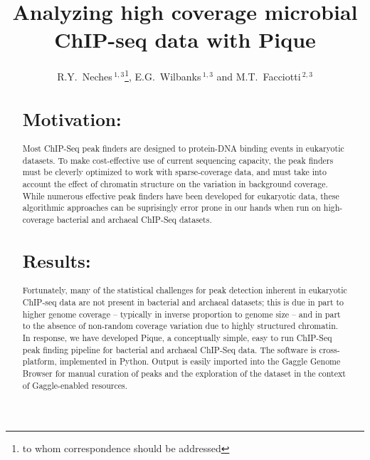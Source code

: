 \documentclass{bioinfo}
\begin{document}

\title[In a fit of pique]{Analyzing high coverage microbial ChIP-seq data with Pique}
\author[Neches \textit{et~al}]{R.Y.~Neches\,$^{1,3}$\footnote{to whom
    correspondence should be addressed}, E.G.~Wilbanks\,$^{1,3}$ and
  M.T.~Facciotti\,$^{2,3}$
\address{$^{1}$Microbiology Graduate Group, University of California, Davis.\\
  $^{2}$Department of Biomedical Engineering, University of
  California, Davis.\\$^{3}$Genome Center, University of California, Davis.}



\maketitle


\begin{abstract}
\section{Motivation:}

Most ChIP-Seq peak finders are designed to protein-DNA binding events in eukaryotic datasets. To make cost-effective use of current sequencing capacity, the peak finders must be cleverly optimized to work with sparse-coverage data, and must take into account the effect of chromatin structure on the variation in background coverage. While numerous effective peak finders have been developed  for eukaryotic data, these algorithmic approaches can be suprisingly error prone in our hands when run on high-coverage bacterial and archaeal ChIP-Seq datasets.  


\section{Results:}
Fortunately, many of the statistical challenges for peak detection inherent in eukaryotic ChIP-seq data are not present in bacterial and archaeal datasets; this is due in part to higher genome coverage -- typically in inverse proportion to genome size -- and in part to the absence of non-random coverage variation due to highly structured chromatin.  In response, we have developed Pique, a conceptually simple, easy to run ChIP-Seq peak finding pipeline for bacterial and archaeal ChIP-Seq data.  The software is cross-platform, implemented in Python.  Output is easily imported into the Gaggle Genome Browser for manual curation of peaks and the exploration of the dataset in the context of Gaggle-enabled resources.  


\end{abstract}}
\end{document}
